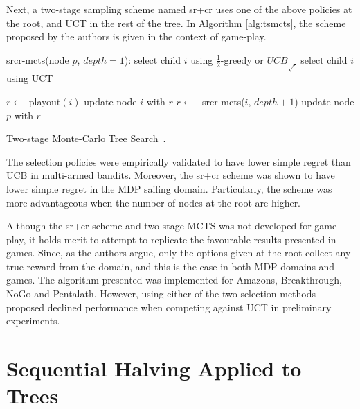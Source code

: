 \documentclass{kecsmstr}
\newcommand{\func}[1]{{\sc #1}}
\begin{document}
Next, a two-stage sampling scheme named {\sc sr+cr} uses one of the above policies at the root, and UCT in the rest of the tree. In Algorithm \ref{alg:tsmcts}, the scheme proposed by the authors is given in the context of game-play.
\IncMargin{1em}
\begin{algorithm2e}[ht]
	\func{srcr-mcts}(node $p$, $depth = 1$):														\;
	\Indp							
	 {
	select child $i$ using $\frac{1}{2}$-greedy or ${UCB}_{\sqrt{.}}$								\;
	}
	{
	select child $i$ using UCT 																		\;
	}

     {
    	$r \gets$ {\sc playout}$(i)$ 																\;
    	\func{update} node $i$ with $r$																\;
    }
    {
    	$r \gets$ -\func{srcr-mcts}($i$, $depth + 1$)												\;
    }	
    \func{update} node $p$ with $r$																	\;
	\Indm
  \caption[Two-stage Monte-Carlo Tree Search]{Two-stage Monte-Carlo Tree Search~\protect{}. \label{alg:tsmcts}}
\end{algorithm2e}
\DecMargin{1em}

The selection policies were empirically validated to have lower simple regret than UCB in multi-armed bandits. Moreover, the {\sc sr+cr} scheme was shown to have lower simple regret in the MDP sailing domain. Particularly, the scheme was more advantageous when the number of nodes at the root are higher.

Although the {\sc sr+cr} scheme and two-stage MCTS was not developed for game-play, it holds merit to attempt to replicate the favourable results presented in games. Since, as the authors argue, only the options given at the root collect any true reward from the domain, and this is the case in both MDP domains and games. The algorithm presented was implemented for Amazons, Breakthrough, NoGo and Pentalath. However, using either of the two selection methods proposed declined performance when competing against UCT in preliminary experiments.

\section{Sequential Halving Applied to Trees}
\label{sec:SHOT}
\end{document}
